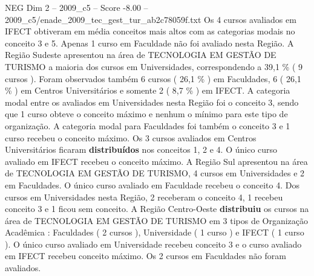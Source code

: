 \begin{textsample}{NEG Dim 2 – 2009\_c5 – Score -8.00 – 2009\_c5/enade\_2009\_tec\_gest\_tur\_ab2c78059f.txt}
Os 4 cursos avaliados em IFECT obtiveram em média conceitos mais altos com as categorias modais no conceito 3 e 5.
Apenas 1 curso em Faculdade não foi avaliado nesta Região.
A Região Sudeste apresentou na área de TECNOLOGIA EM GESTÃO DE TURISMO a maioria dos cursos em Universidades, correspondendo a 39,1 \% ( 9 cursos ).
Foram observados também 6 cursos ( 26,1 \% ) em Faculdades, 6 ( 26,1 \% ) em Centros Universitários e somente 2 ( 8,7 \% ) em IFECT.
A categoria modal entre os avaliados em Universidades nesta Região foi o conceito 3, sendo que 1 curso obteve o conceito máximo e nenhum o mínimo para este tipo de organização.
A categoria modal para Faculdades foi também o conceito 3 e 1 curso recebeu o conceito máximo.
Os 3 cursos avaliados em Centros Universitários ficaram \textbf{distribuídos} nos conceitos 1, 2 e 4.
O único curso avaliado em IFECT recebeu o conceito máximo.
A Região Sul apresentou na área de TECNOLOGIA EM GESTÃO DE TURISMO, 4 cursos em Universidades e 2 em Faculdades.
O único curso avaliado em Faculdade recebeu o conceito 4.
Dos cursos em Universidades nesta Região, 2 receberam o conceito 4, 1 recebeu conceito 3 e 1 ficou sem conceito.
A Região Centro-Oeste \textbf{distribuiu} os cursos na área de TECNOLOGIA EM GESTÃO DE TURISMO em 3 tipos de Organização Acadêmica : Faculdades ( 2 cursos ), Universidade ( 1 curso ) e IFECT ( 1 curso ).
O único curso avaliado em Universidade recebeu conceito 3 e o curso avaliado em IFECT recebeu conceito máximo.
Os 2 cursos em Faculdades não foram avaliados.

\end{textsample}
